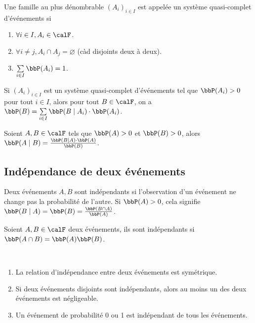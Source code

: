 \begin{deff}
    Une famille au plus dénombrable $(A_i)_{i \in I}$ est appelée un système quasi-complet d'événements si
    \begin{enumerate}
        \item $\forall i \in I, A_i \in \calF$.
        \item $\forall i \neq j, A_i \cap A_j = \varnothing$ (càd disjoints deux à deux).
        \item $\sum\limits_{i \in I} \bbP(A_i) = 1$.
    \end{enumerate}
\end{deff}

\begin{thm}
    Si $(A_i)_{i \in I}$ est un système quasi-complet d'événements tel que $\bbP(A_i) > 0$ pour tout $i \in I$,
    alors pour tout $B \in \calF$, on a $\bbP(B) = \sum\limits_{i \in I} \bbP(B \mid A_i) \cdot \bbP(A_i)$.
\end{thm}

\begin{thm}
    Soient $A, B \in \calF$ tels que $\bbP(A) > 0$ et $\bbP(B) > 0$,
    alors $\bbP(A \mid B) = \frac{\bbP(B \mid A) \cdot \bbP(A)}{\bbP(B)}$.
\end{thm}

\subsection*{Indépendance de deux événements}

\begin{rqq}
    Deux événements $A, B$ sont indépendants si l'observation d'un événement ne change pas la probabilité de l'autre.
    Si $\bbP(A) > 0$, cela signifie $\bbP(B \mid A) = \bbP(B) = \frac{\bbP(B \cap A)}{\bbP(A)}$.
\end{rqq}

\begin{deff}
    Soient $A, B \in \calF$ deux événements, ils sont indépendants si $\bbP(A \cap B) = \bbP(A) \bbP(B)$.
\end{deff}

\begin{rqq}
    $\ $
    \begin{enumerate}
        \item La relation d'indépendance entre deux événements est symétrique.
        \item Si deux événements disjoints sont indépendants,
              alors au moins un des deux événements est négligeable.
        \item Un événement de probabilité 0 ou 1 est indépendant de tous les événements.
    \end{enumerate}
\end{rqq}

